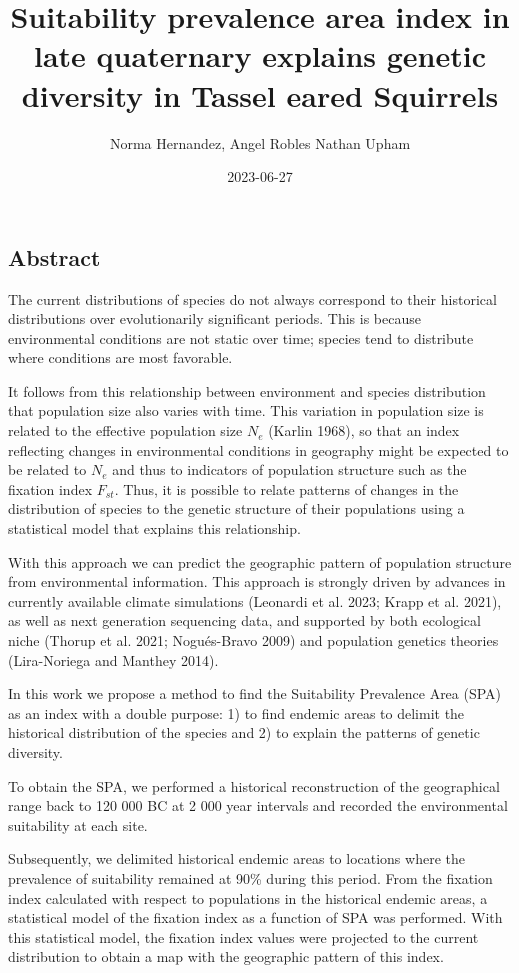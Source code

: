 \documentclass[
]{article}
\title{Suitability prevalence area index in late quaternary explains
genetic diversity in Tassel eared Squirrels}
\author{Norma Hernandez, Angel Robles Nathan Upham}
\date{2023-06-27}
\begin{document}
\maketitle

\hypertarget{abstract}{%
\subsection{Abstract}\label{abstract}}

The current distributions of species do not always correspond to their
historical distributions over evolutionarily significant periods. This
is because environmental conditions are not static over time; species
tend to distribute where conditions are most favorable.

It follows from this relationship between environment and species
distribution that population size also varies with time. This variation
in population size is related to the effective population size \(N_e\)
(Karlin 1968), so that an index reflecting changes in environmental
conditions in geography might be expected to be related to \(N_e\) and
thus to indicators of population structure such as the fixation index
\(F_{st}\). Thus, it is possible to relate patterns of changes in the
distribution of species to the genetic structure of their populations
using a statistical model that explains this relationship.

With this approach we can predict the geographic pattern of population
structure from environmental information. This approach is strongly
driven by advances in currently available climate simulations (Leonardi
et al. 2023; Krapp et al. 2021), as well as next generation sequencing
data, and supported by both ecological niche (Thorup et al. 2021;
Nogués-Bravo 2009) and population genetics theories (Lira-Noriega and
Manthey 2014).

In this work we propose a method to find the Suitability Prevalence Area
(SPA) as an index with a double purpose: 1) to find endemic areas to
delimit the historical distribution of the species and 2) to explain the
patterns of genetic diversity.

To obtain the SPA, we performed a historical reconstruction of the
geographical range back to 120 000 BC at 2 000 year intervals and
recorded the environmental suitability at each site.

Subsequently, we delimited historical endemic areas to locations where
the prevalence of suitability remained at 90\% during this period. From
the fixation index calculated with respect to populations in the
historical endemic areas, a statistical model of the fixation index as a
function of SPA was performed. With this statistical model, the fixation
index values were projected to the current distribution to obtain a map
with the geographic pattern of this index.
\end{document}
